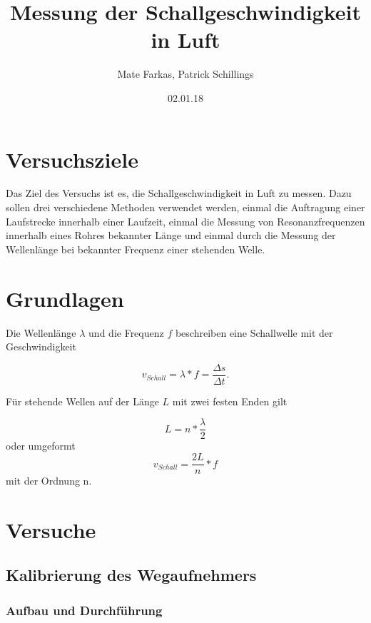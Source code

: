 \documentclass[]{article}
\title{Messung der Schallgeschwindigkeit in Luft}
\date{02.01.18}
\author{Mate Farkas, Patrick Schillings}
\begin{document}
	
	
	\tableofcontents
	
	\noindent\makebox[\linewidth]{\rule{\textwidth}{0.4pt}}
	
	\section{Versuchsziele}
	
	Das Ziel des Versuchs ist es, die Schallgeschwindigkeit in Luft zu messen. Dazu sollen drei verschiedene Methoden verwendet werden, einmal die Auftragung einer Laufstrecke innerhalb einer Laufzeit, einmal die Messung von Resonanzfrequenzen innerhalb eines Rohres bekannter Länge und einmal durch die Messung der Wellenlänge bei bekannter Frequenz einer stehenden Welle.
	
	\section{Grundlagen} %
	
	Die Wellenlänge $\lambda$ und die Frequenz $f$ beschreiben eine Schallwelle mit der Geschwindigkeit
	
	\begin{equation}
		v_{Schall}=\lambda*f=\frac{\Delta s}{\Delta t}.
		\label{e1}
	\end{equation}
	
	Für stehende Wellen auf der Länge $L$ mit zwei festen Enden gilt
	
	\begin{equation}
		L=n*\frac{\lambda}{2}
		\label{e2}
	\end{equation}
	oder umgeformt
	\begin{equation}
	v_{Schall}=\frac{2L}{n}*f
	\label{e3} 
	\end{equation}	
	mit der Ordnung n.
	
	
	\section{Versuche}
	
	\subsection{Kalibrierung des Wegaufnehmers}
	\subsubsection{Aufbau und Durchführung}
\end{document}
